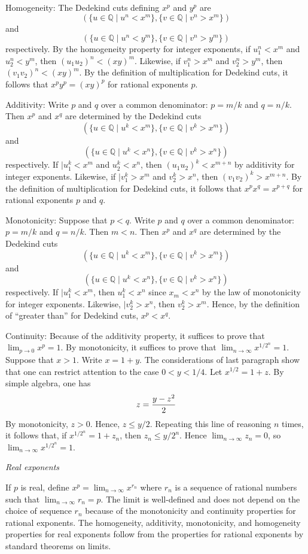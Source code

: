 \documentclass[12pt]{article}
\begin{document}
Homogeneity:  The Dedekind cuts defining $x^p$ and $y^p$ are
 $$( \{u \in \mathbb{Q} \mid u^n < x^m \}, \{v \in \mathbb{Q} \mid v^n > x^m \} )$$
and
 $$( \{u \in \mathbb{Q} \mid u^n < y^m \}, \{v \in \mathbb{Q} \mid v^n > y^m \} )$$
respectively.  By the homogeneity property for integer exponents, if $u_1^n < x^m$ and $u_2^n < y^m$, then $(u_1 u_2)^n < (xy)^m$.  Likewise, if $v_1^n > x^m$ and $v_2^n > y^m$, then $(v_1 v_2)^n < (xy)^m$.  By the definition of multiplication for Dedekind cuts, it follows that $x^p y^p = (xy)^p$ for rational exponents $p$.

Additivity:  Write $p$ and $q$ over a common denominator: $p = m/k$ and $q = n/k$.  Then $x^p$ and $x^q$ are determined by the Dedekind cuts
 $$( \{u \in \mathbb{Q} \mid u^k < x^m \}, \{v \in \mathbb{Q} \mid v^k > x^m \} )$$
and
 $$( \{u \in \mathbb{Q} \mid u^k < x^n \}, \{v \in \mathbb{Q} \mid v^k > x^n \} )$$
respectively.  If $\mid u_1^k < x^m$ and $u_2^k < x^n$, then $(u_1 u_2)^k < x^{m+n}$ by additivity for integer exponents.  Likewise, if $\mid v_1^k > x^m$ and $v_2^k > x^n$, then $(v_1 v_2)^k > x^{m+n}$.  By the definition of multiplication for Dedekind cuts, it follows that $x^p x^q = x^{p+q}$ for rational exponents $p$ and $q$.

Monotonicity: Suppose that $p < q$.  Write $p$ and $q$ over a common denominator: $p = m/k$ and $q = n/k$.  Then $m < n$.  Then $x^p$ and $x^q$ are determined by the Dedekind cuts
 $$( \{u \in \mathbb{Q} \mid u^k < x^m \}, \{v \in \mathbb{Q} \mid v^k > x^m \} )$$
and
 $$( \{u \in \mathbb{Q} \mid u^k < x^n \}, \{v \in \mathbb{Q} \mid v^k > x^n \} )$$
respectively.  If $\mid u_1^k < x^m$, then $u_1^k < x^n$ since $x_m < x^n$ by the law of monotonicity for integer exponents.  Likewise, $\mid v_2^k > x^n$, then $v_2^k > x^m$.  Hence, by the definition of ``greater than'' for Dedekind cuts, $x^p < x^q$.

Continuity:  Because of the additivity property, it suffices to prove that $\lim_{p \to 0} x^p = 1$.  By monotonicity, it suffices to prove that $\lim_{n \to \infty} x^{1/2^n} = 1$.  Suppose that $x > 1$. Write $x = 1 + y$.  The considerations of last paragraph show that one can restrict attention to the case $0 < y < 1/4$.  Let $x^{1/2} = 1 + z$.  By simple algebra, one has
 $$z = {y - z^2 \over 2}$$
By monotonicity, $z > 0$.   Hence, $z \le y/2$.  Repeating this line of reasoning $n$ times, it follows that, if $x^{1/2^n} = 1 + z_n$, then $z_n \le y / 2^n$.  Hence $\lim_{n \to \infty} z_n = 0$, so $\lim_{n \to \infty} x^{1/2^n} = 1$.

\emph{Real exponents}

If $p$ is real, define $x^p = \lim_{n \to \infty} x^{r_n}$ where $r_n$ is a sequence of rational numbers such that $\lim_{n \to \infty} r_n = p$.  The limit is well-defined and does not depend on the choice of sequence $r_n$ because of the monotonicity and continuity properties for rational exponents.  The homogeneity, additivity, monotonicity, and homogeneity properties for real exponents follow from the properties for rational exponents by standard theorems on limits.
\end{document}
